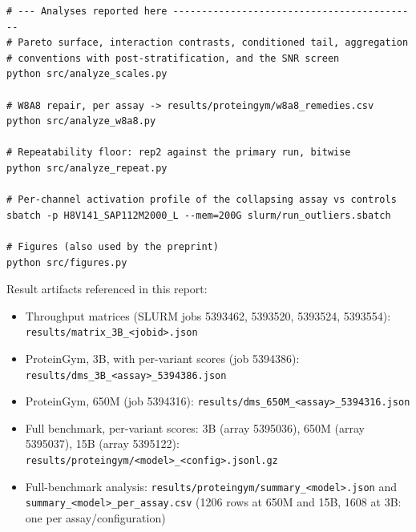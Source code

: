 \documentclass[11pt]{article}
\begin{document}
\begin{footnotesize}
\begin{verbatim}
# --- Analyses reported here -------------------------------------------
# Pareto surface, interaction contrasts, conditioned tail, aggregation
# conventions with post-stratification, and the SNR screen
python src/analyze_scales.py

# W8A8 repair, per assay -> results/proteingym/w8a8_remedies.csv
python src/analyze_w8a8.py

# Repeatability floor: rep2 against the primary run, bitwise
python src/analyze_repeat.py

# Per-channel activation profile of the collapsing assay vs controls
sbatch -p H8V141_SAP112M2000_L --mem=200G slurm/run_outliers.sbatch

# Figures (also used by the preprint)
python src/figures.py
\end{verbatim}
\end{footnotesize}

\noindent
Result artifacts referenced in this report:

\begin{footnotesize}
\begin{itemize}\setlength{\itemsep}{0pt}
  \item Throughput matrices (SLURM jobs 5393462, 5393520, 5393524, 5393554):\\
        \texttt{results/matrix\_3B\_<jobid>.json}
  \item ProteinGym, 3B, with per-variant scores (job 5394386):\\
        \texttt{results/dms\_3B\_<assay>\_5394386.json}
  \item ProteinGym, 650M (job 5394316):
        \texttt{results/dms\_650M\_<assay>\_5394316.json}
  \item Full benchmark, per-variant scores: 3B (array 5395036),
        650M (array 5395037), 15B (array 5395122):\\
        \texttt{results/proteingym/<model>\_<config>.jsonl.gz}
  \item Full-benchmark analysis:
        \texttt{results/proteingym/summary\_<model>.json} and\\
        \texttt{summary\_<model>\_per\_assay.csv} (1206 rows at 650M and
        15B, 1608 at 3B: one per
        assay/configuration)
\end{itemize}
\end{footnotesize}
\end{document}
